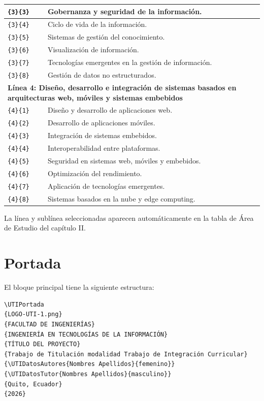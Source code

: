 \documentclass[12pt,a4paper,oneside]{report}
\begin{document}
\begin{longtable}{|p{2cm}|p{10.6cm}|}
  \hline
  \texttt{\{3\}\{3\}} & Gobernanza y seguridad de la información. \\
  \hline
  \texttt{\{3\}\{4\}} & Ciclo de vida de la información. \\
  \hline
  \texttt{\{3\}\{5\}} & Sistemas de gestión del conocimiento. \\
  \hline
  \texttt{\{3\}\{6\}} & Visualización de información. \\
  \hline
  \texttt{\{3\}\{7\}} & Tecnologías emergentes en la gestión de información. \\
  \hline
  \texttt{\{3\}\{8\}} & Gestión de datos no estructurados. \\
  \hline
  \multicolumn{2}{|p{12.6cm}|}{\textbf{Línea 4: Diseño, desarrollo e integración de sistemas basados en arquitecturas web, móviles y sistemas embebidos}} \\
  \hline
  \texttt{\{4\}\{1\}} & Diseño y desarrollo de aplicaciones web. \\
  \hline
  \texttt{\{4\}\{2\}} & Desarrollo de aplicaciones móviles. \\
  \hline
  \texttt{\{4\}\{3\}} & Integración de sistemas embebidos. \\
  \hline
  \texttt{\{4\}\{4\}} & Interoperabilidad entre plataformas. \\
  \hline
  \texttt{\{4\}\{5\}} & Seguridad en sistemas web, móviles y embebidos. \\
  \hline
  \texttt{\{4\}\{6\}} & Optimización del rendimiento. \\
  \hline
  \texttt{\{4\}\{7\}} & Aplicación de tecnologías emergentes. \\
  \hline
  \texttt{\{4\}\{8\}} & Sistemas basados en la nube y edge computing. \\
  \hline
\end{longtable}

La línea y sublínea seleccionadas aparecen automáticamente en la tabla de Área de Estudio del capítulo II.

\section{Portada}

El bloque principal tiene la siguiente estructura:

\begin{lstlisting}
\UTIPortada
{LOGO-UTI-1.png}
{FACULTAD DE INGENIERÍAS}
{INGENIERÍA EN TECNOLOGÍAS DE LA INFORMACIÓN}
{TÍTULO DEL PROYECTO}
{Trabajo de Titulación modalidad Trabajo de Integración Curricular}
{\UTIDatosAutores{Nombres Apellidos}{femenino}}
{\UTIDatosTutor{Nombres Apellidos}{masculino}}
{Quito, Ecuador}
{2026}
\end{lstlisting}
\end{document}
